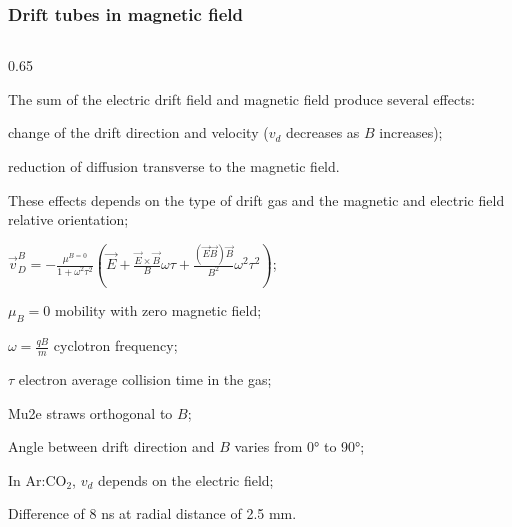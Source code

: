 \documentclass{beamer}
\begin{document}
\begin{frame}
    \frametitle{Drift tubes in magnetic field}

    \vspace{-3mm}
    \begin{columns}
        \begin{column}{0.65\framewidth}
            \setlength{\leftmargini}{1.1em}
            \begin{itemize}
               {\small \item The sum of the electric drift field and magnetic field produce several effects: }
               \begin{itemize}
                {\small       \item change of the drift direction and velocity ($v_d$ decreases 
                as $B$ increases); 
                \item reduction of diffusion transverse to the magnetic field. 
                } 
            \end{itemize}
                {\footnotesize \item These effects depends on the type of drift gas 
                and the magnetic and electric field relative orientation;
                \item    $     \vec{v}_D^B=-\frac{\mu^{B=0}}{1+\omega^2 \tau^2}\left(\vec{E}+\frac{\vec{E} \times \vec{B}}{B} \omega \tau+\frac{(\vec{E} \vec{B}) \vec{B}}{B^2} \omega^2 \tau^2\right)$;
                \item $\mu_B = 0$ mobility with zero magnetic field;
                \item $\omega = \frac{qB}{m}$ cyclotron frequency; 
                \item $\tau$ electron average collision time in the gas;
                \item Mu2e straws orthogonal to $B$;
                \item Angle between drift direction and $B$ varies from 0° to 90°;
                \item In Ar:CO$_2$, $v_{d}$ depends on the electric field;
                \item Difference of 8 ns at radial distance of 2.5 mm.

                }
                 

\end{itemize}
\end{column}
\end{columns}
\end{frame}
\end{document}
